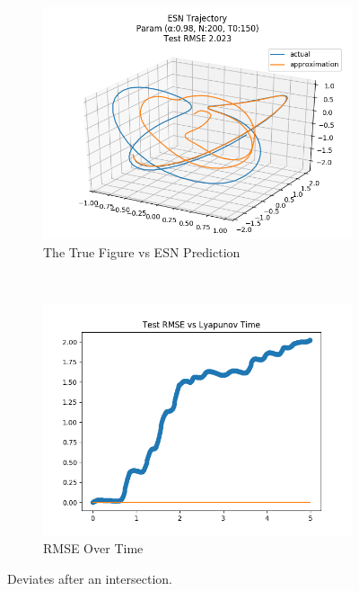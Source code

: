 \documentclass{article}
\begin{document}
\begin{figure}[H]
    \centering
    \begin{subfigure}[b]{0.45\textwidth}
        \includegraphics[width=\textwidth]{doc/paper/images/lorenz/rank_2_param_458_fit.png}
        \caption{The True Figure vs ESN Prediction}
        \label{fig:lorenz_r2_fit}
    \end{subfigure}
    ~
    \begin{subfigure}[b]{0.45\textwidth}
        \includegraphics[width=\textwidth]{doc/paper/images/lorenz/rank_2_param_458_rmse.png}
        \caption{RMSE Over Time}
        \label{fig:lorenz_r2_rmse}
    \end{subfigure}
    \caption{Deviates after an intersection.}
    \label{fig:lorenz_r2}
\end{figure}
\end{document}
